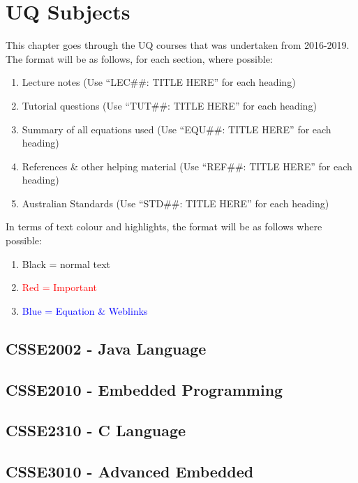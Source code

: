 \pagestyle{fancy}
\fancyfoot[R]{\thepage}
\renewcommand{\headrulewidth}{0.4pt}
\renewcommand{\footrulewidth}{2pt}

\section{UQ Subjects} %
This chapter goes through the UQ courses that was undertaken from 2016-2019. The format will be as follows, for each section, where possible:
\begin{enumerate}
  \item Lecture notes (Use ``LEC\#\#: TITLE HERE'' for each heading)
  \item Tutorial questions (Use ``TUT\#\#: TITLE HERE'' for each heading)
  \item Summary of all equations used (Use ``EQU\#\#: TITLE HERE'' for each heading)
  \item References \& other helping material (Use ``REF\#\#: TITLE HERE'' for each heading)
  \item Australian Standards (Use ``STD\#\#: TITLE HERE'' for each heading)
\end{enumerate}

In terms of text colour and highlights, the format will be as follows where possible:
\begin{enumerate}
  \item Black = normal text
  \item \textcolor{red}{Red = Important}
  \item \textcolor{blue}{Blue = Equation \& Weblinks}
\end{enumerate}

\subsection{CSSE2002 - Java Language}
\clearpage

\subsection{CSSE2010 - Embedded Programming}
\clearpage

\subsection{CSSE2310 - C Language}
\clearpage

\subsection{CSSE3010 - Advanced Embedded}
\clearpage

